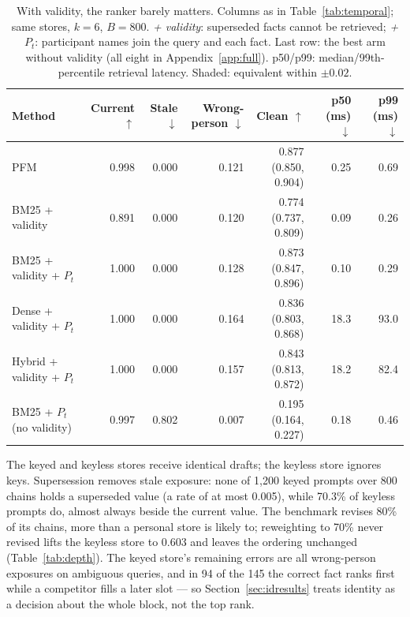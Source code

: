 \documentclass{article} %
\begin{document}
\begin{table}[t]
\centering
\small
\setlength{\tabcolsep}{4pt}
\begin{tabular}{@{}lrrrrrr@{}}
\toprule
Method & Current $\uparrow$ & Stale $\downarrow$ & Wrong-person $\downarrow$ & Clean $\uparrow$ & p50 (ms) $\downarrow$ & p99 (ms) $\downarrow$ \\
\midrule
PFM & 0.998 & 0.000 & 0.121 & \cellcolor{cPos!60}0.877 {\scriptsize(0.850, 0.904)} & 0.25 & 0.69 \\
BM25 + validity & 0.891 & 0.000 & 0.120 & 0.774 {\scriptsize(0.737, 0.809)} & 0.09 & 0.26 \\
BM25 + validity + $P_t$ & 1.000 & 0.000 & 0.128 & \cellcolor{cPos!60}0.873 {\scriptsize(0.847, 0.896)} & 0.10 & 0.29 \\
Dense + validity + $P_t$ & 1.000 & 0.000 & 0.164 & 0.836 {\scriptsize(0.803, 0.868)} & 18.3 & 93.0 \\
Hybrid + validity + $P_t$ & 1.000 & 0.000 & 0.157 & 0.843 {\scriptsize(0.813, 0.872)} & 18.2 & 82.4 \\
\midrule
BM25 + $P_t$ (no validity) & 0.997 & 0.802 & 0.007 & 0.195 {\scriptsize(0.164, 0.227)} & 0.18 & 0.46 \\
\bottomrule
\end{tabular}
\caption{With validity, the ranker barely matters. Columns as in Table~\ref{tab:temporal}; same stores, $k{=}6$, $B{=}800$. \emph{+ validity}: superseded facts cannot be retrieved; \emph{+ $P_t$}: participant names join the query and each fact. Last row: the best arm without validity (all eight in Appendix~\ref{app:full}). p50/p99: median/99th-percentile retrieval latency. Shaded: equivalent within $\pm0.02$.}
\label{tab:baselines}
\end{table}

The keyed and keyless stores receive identical drafts; the keyless store ignores keys. Supersession removes stale exposure: none of 1{,}200 keyed prompts over 800 chains holds a superseded value (a rate of at most 0.005), while 70.3\% of keyless prompts do, almost always beside the current value. The benchmark revises 80\% of its chains, more than a personal store is likely to; reweighting to 70\% never revised lifts the keyless store to 0.603 and leaves the ordering unchanged (Table~\ref{tab:depth}). The keyed store's remaining errors are all wrong-person exposures on ambiguous queries, and in 94 of the 145 the correct fact ranks first while a competitor fills a later slot --- so Section~\ref{sec:idresults} treats identity as a decision about the whole block, not the top rank.
\end{document}
